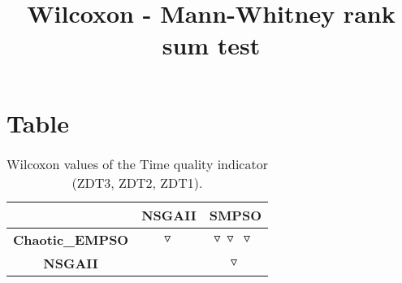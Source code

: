 \documentclass{article}
\title{Wilcoxon - Mann-Whitney rank sum test}
\author{}
\begin{document}
\maketitle
\section{Table}
\begin{table}[!htp]
  \caption{Wilcoxon values of the Time quality indicator (ZDT3, ZDT2, ZDT1).}
  \label{table:Time}
  \centering
  \begin{scriptsize}
  \begin{tabular}{c|cc}
      & \textbf{NSGAII} & \textbf{SMPSO} \\\hline
      \textbf{Chaotic_EMPSO} & $\triangledown\  $ & $ \triangledown\ \triangledown\ \triangledown\ $ \\
      \textbf{NSGAII} & $ $ & $ \triangledown\ $ \\
  \end{tabular}
  \end{scriptsize}
\end{table}
\end{document}
